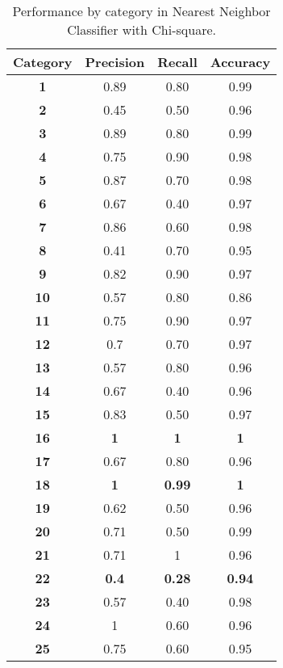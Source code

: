 \documentclass[10pt,twocolumn,letterpaper]{article}
\begin{document}
\begin{table}[h!]
\centering
\caption{Performance by category in Nearest Neighbor Classifier with Chi-square.}
\label{NN}
\begin{tabular}{|c|c|c|c|}
\hline
\multicolumn{1}{|l|}{\textbf{Category}} & \multicolumn{1}{l|}{\textbf{Precision}} & \multicolumn{1}{l|}{\textbf{Recall}} & \multicolumn{1}{l|}{\textbf{Accuracy}} \\ \hline
\textbf{1} & 0.89 & 0.80 & 0.99 \\ \hline
\textbf{2} & 0.45 & 0.50 & 0.96 \\ \hline
\textbf{3} & 0.89 & 0.80 & 0.99 \\ \hline
\textbf{4} & 0.75 & 0.90 & 0.98 \\ \hline
\textbf{5} & 0.87 & 0.70 & 0.98 \\ \hline
\textbf{6} & 0.67 & 0.40 & 0.97 \\ \hline
\textbf{7} & 0.86 & 0.60 & 0.98 \\ \hline
\textbf{8} & 0.41 & 0.70 & 0.95 \\ \hline
\textbf{9} & 0.82 & 0.90 & 0.97 \\ \hline
\textbf{10} & 0.57 & 0.80 & 0.86 \\ \hline
\textbf{11} & 0.75 & 0.90 & 0.97 \\ \hline
\textbf{12} & 0.7 & 0.70 & 0.97 \\ \hline
\textbf{13} & 0.57 & 0.80 & 0.96 \\ \hline
\textbf{14} & 0.67 & 0.40 & 0.96 \\ \hline
\textbf{15} & 0.83 & 0.50 & 0.97 \\ \hline
\rowcolor[HTML]{32CB00} 
\textbf{16} & \textbf{1} & \textbf{1} & \textbf{1} \\ \hline
\textbf{17} & 0.67 & 0.80 & 0.96 \\ \hline
\rowcolor[HTML]{32CB00} 
\textbf{18} & \textbf{1} & \textbf{0.99} & \textbf{1} \\ \hline
\textbf{19} & 0.62 & 0.50 & 0.96 \\ \hline
\textbf{20} & 0.71 & 0.50 & 0.99 \\ \hline
\textbf{21} & 0.71 & 1 & 0.96 \\ \hline
\rowcolor[HTML]{FD6864} 
{\color[HTML]{333333} \textbf{22}} & {\color[HTML]{333333} \textbf{0.4}} & {\color[HTML]{333333} \textbf{0.28}} & {\color[HTML]{333333} \textbf{0.94}} \\ \hline
\textbf{23} & 0.57 & 0.40 & 0.98 \\ \hline
\textbf{24} & 1 & 0.60 & 0.96 \\ \hline
\textbf{25} & 0.75 & 0.60 & 0.95 \\ \hline
\end{tabular}
\end{table}
\end{document}
